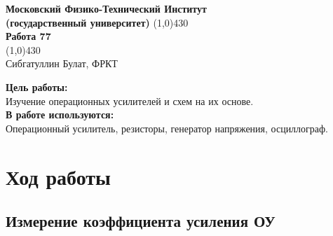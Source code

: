 \documentclass[a4paper, 12pt]{article}%
\begin{document}
\begin{titlepage}

\begin{center}
\large\textbf{Московский Физико-Технический Институт}\\
\large\textbf{(государственный университет)}
\vfill
\line(1,0){430}\\[1mm]
\huge\textbf{Работа 77}\\
\line(1,0){430}\\[1mm]
\vfill
\large Сибгатуллин Булат, ФРКТ\\
\end{center}

\end{titlepage}
\noindent \textbf{Цель работы:} \\
\indent Изучение операционных усилителей и схем на их основе.\\
\noindent \textbf{В работе используются:} \\
\indent Операционный усилитель, резисторы, генератор напряжения, осциллограф.

\section{Ход работы}

\subsection{Измерение коэффициента усиления ОУ}
\end{document}
